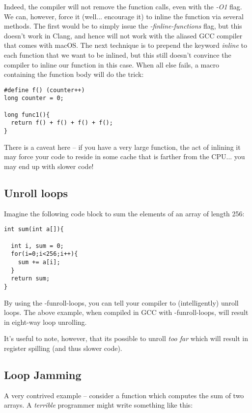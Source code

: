 \documentclass[10pt]{article}
\renewcommand{\#}{\raisebox{.22ex}{\large\old}}
\begin{document}
\noindent Indeed, the compiler will not remove the function calls, even with the \textit{-O1} flag. We can, however, force it (well... encourage it) to inline the function via several methods. The first would be to simply issue the \textit{-finline-functions} flag, but this doesn't work in Clang, and hence will not work with the aliased GCC compiler that comes with macOS. The next technique is to prepend the keyword \textit{inline} to each function that we want to be inlined, but this still doesn't convince the compiler to inline our function in this case. When all else fails, a macro containing the function body will do the trick:

\newpage

\begin{lstlisting}
#define f() (counter++)
long counter = 0;

long func1(){
  return f() + f() + f() + f();
}
\end{lstlisting}

\noindent There is a caveat here -- if you have a very large function, the act of inlining it may force your code to reside in some cache that is farther from the CPU... you may end up with slower code!

\subsection{Unroll loops}
Imagine the following code block to sum the elements of an array of length 256:

\begin{lstlisting}
int sum(int a[]){

  int i, sum = 0;
  for(i=0;i<256;i++){
    sum += a[i];
  }
  return sum;
}
\end{lstlisting}

\noindent By using the -funroll-loops, you can tell your compiler to (intelligently) unroll loops. The above example, when compiled in GCC with -funroll-loops, will result in eight-way loop unrolling.

\noindent It's useful to note, however, that its possible to unroll \textit{too far} which will result in register spilling (and thus slower code).


\subsection{Loop Jamming}
A very contrived example -- consider a function which computes the sum of two arrays. A \textit{terrible} programmer might write something like this:
\end{document}
